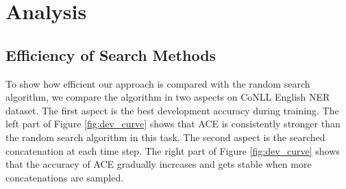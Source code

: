 \documentclass[11pt,a4paper]{article}
\begin{document}
\begin{figure*}[t!]
\begin{minipage}{1.0\linewidth}
\centering
{}
\caption{Comparing the efficiency of random search ({\tt Random}) and ACE. The x-axis is the number of time steps. The left y-axis is the averaged best validation accuracy on CoNLL English NER dataset. The right y-axis is the averaged validation accuracy of the current selection.}
\label{fig:dev_curve}
\end{minipage}
\end{figure*}



\section{Analysis}

\subsection{Efficiency of Search Methods}
To show how efficient our approach is compared with the random search algorithm, we compare the algorithm in two aspects on CoNLL English NER dataset. The first aspect is the best development accuracy during training. The left part of Figure \ref{fig:dev_curve} shows that ACE is consistently stronger than the random search algorithm in this task. The second aspect is the searched concatenation at each time step. The right part of Figure \ref{fig:dev_curve} shows that the accuracy of ACE gradually increases and gets stable when more concatenations are sampled.
\end{document}
